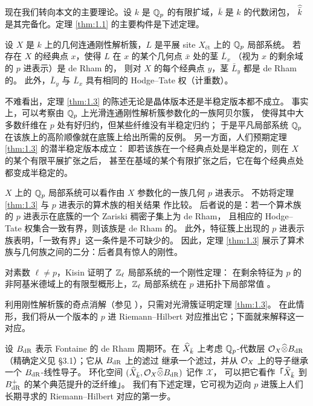 现在我们转向本文的主要理论。设 $k$ 是 $\mathbb{Q}_p$ 的有限扩域，$\bar k$ 是 $k$ 的代数闭包，
$\widehat{\bar k}$ 是其完备化。定理 \ref{thm:1.1} 的主要构件是下述定理。

\begin{thm}\label{thm:1.3}
设 $X$ 是 $k$ 上的几何连通刚性解析簇，$L$ 是平展 site $X_{\text{\'et}}$ 上的 $\mathbb{Q}_p$ 局部系统。
若存在 $X$ 的经典点 $x$，使得 $L$ 在 $x$ 的某个几何点 $\bar x$ 处的茎 $\bar L_x$
（视为 $x$ 的剩余域的 $p$ 进表示）是 de Rham 的，
则对 $X$ 的每个经典点 $y$，茎 $\bar L_y$ 都是 de Rham 的。
此外，$\bar L_y$ 与 $\bar L_x$ 具有相同的 Hodge--Tate 权（计重数）。
\end{thm}

\begin{rmk}\label{rmk:1.4}
不难看出，定理 \ref{thm:1.3} 的陈述无论是晶体版本还是半稳定版本都不成立。
事实上，可以考察由 $\mathbb{Q}_p$ 上光滑连通刚性解析簇参数化的一族阿贝尔簇，
使得其中大多数纤维在 $p$ 处有好归约，但某些纤维没有半稳定归约；
于是平凡局部系统 $\mathbb{Q}_p$ 在该族上的高阶顺像就在底簇上给出所需的反例。
另一方面，人们预期定理 \ref{thm:1.3} 的潜半稳定版本成立：
即若该族在一个经典点处是半稳定的，则在 $X$ 的某个有限平展扩张之后，
甚至在基域的某个有限扩张之后，它在每个经典点处都变成半稳定的。
\end{rmk}

\begin{rmk}\label{rmk:1.5}
$X$ 上的 $\mathbb{Q}_p$ 局部系统可以看作由 $X$ 参数化的一族几何 $p$ 进表示。
不妨将定理 \ref{thm:1.3} 与 $p$ 进表示的算术族的相关结果 \cite{BC,Be} 作比较。
后者说的是：若一个算术族的 $p$ 进表示在底簇的一个 Zariski 稠密子集上为 de Rham，
且相应的 Hodge--Tate 权集合一致有界，则该族是 de Rham 的。
此外，特征簇上出现的 $p$ 进表示族表明，「一致有界」这一条件是不可缺少的。
因此，定理 \ref{thm:1.3} 展示了算术族与几何族之间的二分：后者具有惊人的刚性。
\end{rmk}

\begin{rmk}\label{rmk:1.6}
对素数 $\ell\neq p$，Kisin 证明了 $\mathbb{Z}_\ell$ 局部系统的一个刚性定理：
在剩余特征为 $p$ 的非阿基米德域上的有限型概形上，$\mathbb{Z}_\ell$ 局部系统在 $p$ 进拓扑下局部常值 \cite{Ki}。
\end{rmk}

利用刚性解析簇的奇点消解（参见 \cite{BM}），只需对光滑簇证明定理 \ref{thm:1.3}。
在此情形，我们将从一个版本的 $p$ 进 Riemann--Hilbert 对应推出它；下面就来解释这一对应。

设 $B_{\mathrm{dR}}$ 表示 Fontaine 的 de Rham 周期环。在 $\widehat{X}_{\bar k}$ 上考虑 $\mathbb{Q}_p$-代数层
$\mathcal{O}_X\widehat{\otimes}B_{\mathrm{dR}}$（精确定义见 §3.1）；它从 $B_{\mathrm{dR}}$ 上的滤过
继承一个滤过，并从 $\mathcal{O}_X$ 上的导子继承一个 $B_{\mathrm{dR}}$-线性导子。
环化空间 $(\widehat{X}_{\bar k},\mathcal{O}_X\widehat{\otimes}B_{\mathrm{dR}})$ 记作 $\mathcal X$，
可以把它看作「$\widehat{X}_{\bar k}$ 到 $B_{\mathrm{dR}}^{+}$ 的某个典范提升的泛纤维」。
我们有下述定理，它可视为迈向 $p$ 进簇上人们长期寻求的 Riemann--Hilbert 对应的第一步。

